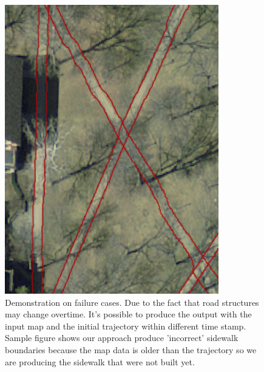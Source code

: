 \begin{figure}[H]
    \centering
    \includegraphics[width=0.83\textwidth]{Figures/oxford_fail_1.png}
    \caption[Failure Case 1]{Demonstration on failure cases. Due to the fact that road structures may change overtime. It's possible to produce the output with the input map and the initial trajectory within different time stamp. Sample figure shows our approach produce 'incorrect' sidewalk boundaries because the map data is older than the trajectory so we are producing the sidewalk that were not built yet.}
    \label{fig:oxford_fail_1}
\end{figure} 

